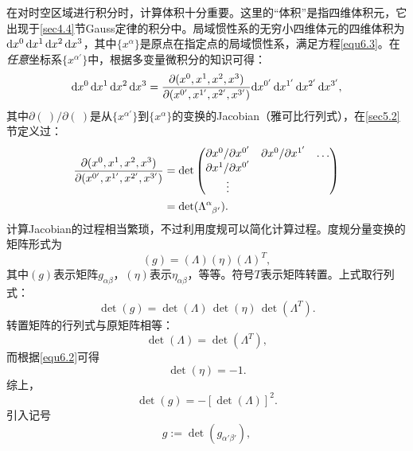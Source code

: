 在对时空区域进行积分时，计算体积十分重要。这里的“体积”是指四维体积元，它出现于\ref{sec4.4}节Gauss定律的积分中。局域惯性系的无穷小四维体元的四维体积为$\mathrm{d} x^0\, \mathrm{d} x^1\, \mathrm{d} x^2\, \mathrm{d} x^3$，其中$\{ x^\alpha \}$是原点在指定点的局域惯性系，满足方程\eqref{equ6.3}。在\textit{任意}坐标系$\{ x^{\alpha'}\}$中，根据多变量微积分的知识可得：
\begin{equation}
    \mathrm{d} x^0\, \mathrm{d} x^1\, \mathrm{d} x^2\, \mathrm{d} x^3 = \frac{\partial (x^0, x^1, x^2, x^3)}{\partial (x^{0'}, x^{1'}, x^{2'}, x^{3'}) } \mathrm{d} x^{0'}\, \mathrm{d} x^{1'}\, \mathrm{d} x^{2'}\, \mathrm{d} x^{3'},
\label{equ6.9}
\end{equation}
其中$\partial (\ ) / \partial (\ )$是从$\{ x^{\alpha'} \}$到$\{ x^\alpha \}$的变换的Jacobian（雅可比行列式），在\ref{sec5.2}节定义过：
\begin{align}
    \frac{\partial (x^0, x^1, x^2, x^3)}{\partial (x^{0'}, x^{1'}, x^{2'}, x^{3'}) } &= \det \begin{pmatrix}
        \partial x^0 / \partial x^{0'} & \partial x^0 / \partial x^{1'} & \dots \\
        \partial x^1 / \partial x^{0'} & \ & \  \\
        \vdots &&
    \end{pmatrix} \notag \\
    &= \det (\Lambda\indices{^\alpha_{\beta'}}). \label{equ6.10}
\end{align}
计算Jacobian的过程相当繁琐，不过利用度规可以简化计算过程。度规分量变换的矩阵形式为
\begin{equation}
    (g) = (\Lambda) (\eta) (\Lambda)^T,
\label{equ6.11}
\end{equation}
其中$(g)$表示矩阵$g_{\alpha \beta}$，$(\eta)$表示$\eta_{\alpha \beta}$，等等。符号$T$表示矩阵转置。上式取行列式：
\begin{equation}
    \det (g) = \det (\Lambda) \, \det (\eta) \, \det (\Lambda^T).
\label{equ6.12}
\end{equation}
转置矩阵的行列式与原矩阵相等：
\begin{equation}
    \det (\Lambda) = \det (\Lambda^T),
\label{equ6.13}
\end{equation}
而根据\eqref{equ6.2}可得
\begin{equation}
    \det (\eta) = -1.
\label{equ6.14}
\end{equation}
综上，
\begin{equation}
    \det (g) = - [\det (\Lambda)]^2.
\label{equ6.15}
\end{equation}
引入记号
\begin{equation}
    g := \det( g_{\alpha' \beta'}),
\label{equ6.16}
\end{equation}
